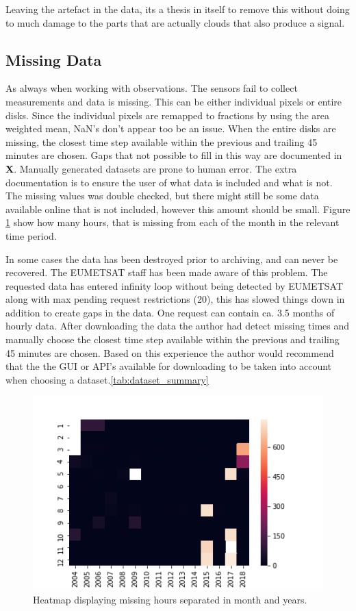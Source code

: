 Leaving the artefact in the data, its a thesis in itself to remove this without doing to much damage to the parts that are actually clouds that also produce a signal.

\subsection{Missing Data} \label{sec:missing_values}
As always when working with observations. The sensors fail to collect  measurements and data is missing. This can be either individual pixels or entire disks. Since the individual pixels are remapped to fractions by using the area weighted mean, NaN's don't appear too be an issue. When the entire disks are missing, the closest time step available within the previous and trailing 45 minutes are chosen. Gaps that not possible to fill in this way are documented in \textbf{X}. Manually generated datasets are prone to human error. The extra documentation is to ensure the user of what data is included and what is not. The missing values was double checked, but there might still be some data available online that is not included, however this amount should be small. Figure \ref{fig:heatmap_missing_values} show how many hours, that is missing from each of the month in the relevant time period. 

In some cases the data has been destroyed prior to archiving, and can never be recovered. The EUMETSAT staff has been made aware of this problem. The requested data has entered infinity loop without being detected by EUMETSAT along with max pending request restrictions (20), this has slowed things down in addition to create gaps in the data. One request can contain ca. 3.5 months of hourly data. After downloading the data the author had detect missing times and manually choose the closest time step available within the previous and trailing 45 minutes are chosen. Based on this experience the author would recommend that the the GUI or API's available for downloading to be taken into account when choosing a dataset.\ref{tab:dataset_summary}

\begin{figure}
    \centering
    \includegraphics[scale = 0.6]{Chapter4_Results/figurs/heat_map_missing_values.png}
    \caption[Heatmap showing missing hours for all months or years.]{Heatmap displaying missing hours separated in month and years.}
    \label{fig:heatmap_missing_values}
\end{figure}

